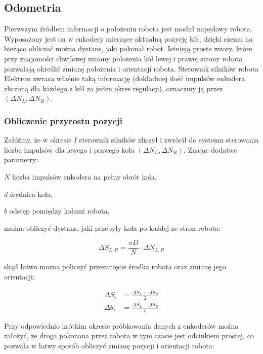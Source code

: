 \subsection{Odometria}

Pierwszym źródłem informacji o położeniu robota jest moduł napędowy robota.
Wyposażony jest on w enkodery mierzące aktualną pozycję kół, dzięki czemu na
bieżąco obliczać można dystans, jaki pokonał robot. Istnieją proste wzory, które
przy znajomości chwilowej zmiany położenia kół lewej i prawej strony robota
pozwalają określić zmianę położenia i orientacji robota. Sterownik silników
robota Elektron zwraca właśnie taką informację (dokładniej ilość impulsów
enkodera zliczoną dla każdego z kół za jeden okres regulacji), oznaczmy ją przez
$(\Delta N_L, \Delta N_R)$.

\subsubsection{Obliczenie przyrostu pozycji}

Załóżmy, że w okresie $I$ sterownik silników zliczył i zwrócił do systemu
sterowania liczbę impulsów dla lewego i prawego koła $(\Delta N_L, \Delta N_R)$.
Znając dodatwe parametry:


\begin{mydescription}{5pt}
\item[$N$] liczba impulsów enkodera na pełny obrót koła,
\item[$d$] średnica koła,
\item[$b$] odstęp pomiędzy kołami robota, 
\end{mydescription}

można obliczyć dystans, jaki przebyły koła po każdej ze stron robota:

\[
\Delta S_{L,R} = \frac{\pi D}{N} \cdot \Delta N_{L,R}
\]

skąd łatwo można policzyć przesunięcie środka robota oraz zmianę jego
orientacji:

\begin{align*}
\Delta S_i &= \frac{\Delta S_L + \Delta S_R}{2} \\
\Delta \theta_i &= \frac{\Delta S_L - \Delta S_R}{b}
\end{align*}

Przy odpowiednio krótkim okresie próbkowania danych z enkoderów można założyć,
że droga pokonana przez robota w tym czasie jest odcinkiem prostej, co pozwala w
łatwy sposób obliczyć zmianę pozycji i orientacji robota:

